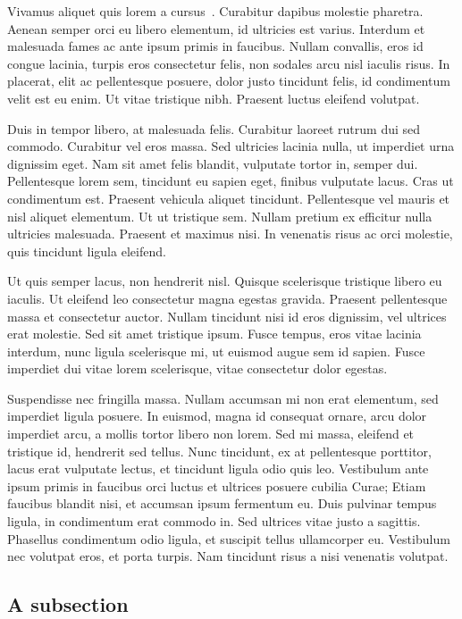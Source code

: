 \documentclass[a4paper,num-refs,numbers,sort&compress]{de-rse}
\begin{document}
Vivamus aliquet quis lorem a cursus~\cite{druskatSoftwareDependenciesResearch2019}. Curabitur dapibus molestie pharetra. Aenean semper orci eu libero elementum, id ultricies est varius. Interdum et malesuada fames ac ante ipsum primis in faucibus. Nullam convallis, eros id congue lacinia, turpis eros consectetur felis, non sodales arcu nisl iaculis risus. In placerat, elit ac pellentesque posuere, dolor justo tincidunt felis, id condimentum velit est eu enim. Ut vitae tristique nibh. Praesent luctus eleifend volutpat.

Duis in tempor libero, at malesuada felis. Curabitur laoreet rutrum dui sed commodo. Curabitur vel eros massa. Sed ultricies lacinia nulla, ut imperdiet urna dignissim eget. Nam sit amet felis blandit, vulputate tortor in, semper dui. Pellentesque lorem sem, tincidunt eu sapien eget, finibus vulputate lacus. Cras ut condimentum est. Praesent vehicula aliquet tincidunt. Pellentesque vel mauris et nisl aliquet elementum. Ut ut tristique sem. Nullam pretium ex efficitur nulla ultricies malesuada. Praesent et maximus nisi. In venenatis risus ac orci molestie, quis tincidunt ligula eleifend.

Ut quis semper lacus, non hendrerit nisl. Quisque scelerisque tristique libero eu iaculis. Ut eleifend leo consectetur magna egestas gravida. Praesent pellentesque massa et consectetur auctor. Nullam tincidunt nisi id eros dignissim, vel ultrices erat molestie. Sed sit amet tristique ipsum. Fusce tempus, eros vitae lacinia interdum, nunc ligula scelerisque mi, ut euismod augue sem id sapien. Fusce imperdiet dui vitae lorem scelerisque, vitae consectetur dolor egestas.

Suspendisse nec fringilla massa. Nullam accumsan mi non erat elementum, sed imperdiet ligula posuere. In euismod, magna id consequat ornare, arcu dolor imperdiet arcu, a mollis tortor libero non lorem. Sed mi massa, eleifend et tristique id, hendrerit sed tellus. Nunc tincidunt, ex at pellentesque porttitor, lacus erat vulputate lectus, et tincidunt ligula odio quis leo. Vestibulum ante ipsum primis in faucibus orci luctus et ultrices posuere cubilia Curae; Etiam faucibus blandit nisi, et accumsan ipsum fermentum eu. Duis pulvinar tempus ligula, in condimentum erat commodo in. Sed ultrices vitae justo a sagittis. Phasellus condimentum odio ligula, et suscipit tellus ullamcorper eu. Vestibulum nec volutpat eros, et porta turpis. Nam tincidunt risus a nisi venenatis volutpat. 

\subsection{A subsection}
\end{document}
